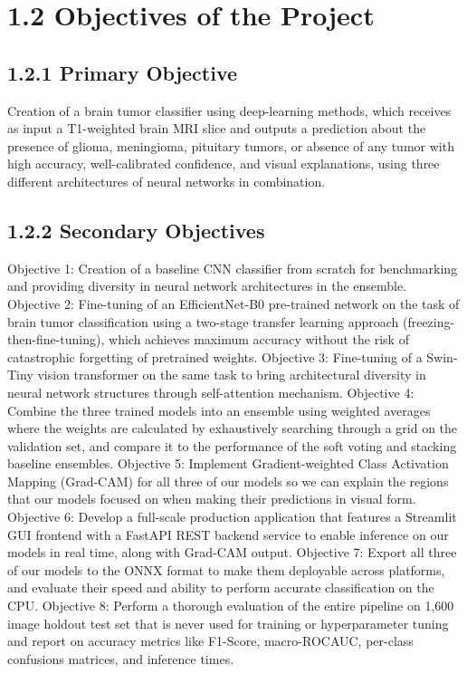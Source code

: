 \documentclass[12pt,a4paper,oneside]{report}
\begin{document}
\section{1.2 Objectives of the Project}
\subsection{1.2.1 Primary Objective}
Creation of a brain tumor classifier using deep-learning methods, which receives as input a T1-weighted brain MRI slice and outputs a prediction about the presence of glioma, meningioma, pituitary tumors, or absence of any tumor with high accuracy, well-calibrated confidence, and visual explanations, using three different architectures of neural networks in combination.
\subsection{1.2.2 Secondary Objectives}
Objective 1: Creation of a baseline CNN classifier from scratch for benchmarking and providing diversity in neural network architectures in the ensemble.
Objective 2: Fine-tuning of an EfficientNet-B0 pre-trained network on the task of brain tumor classification using a two-stage transfer learning approach (freezing-then-fine-tuning), which achieves maximum accuracy without the risk of catastrophic forgetting of pretrained weights.
Objective 3: Fine-tuning of a Swin-Tiny vision transformer on the same task to bring architectural diversity in neural network structures through self-attention mechanism.
Objective 4: Combine the three trained models into an ensemble using weighted averages where the weights are calculated by exhaustively searching through a grid on the validation set, and compare it to the performance of the soft voting and stacking baseline ensembles.
Objective 5: Implement Gradient-weighted Class Activation Mapping (Grad-CAM) for all three of our models so we can explain the regions that our models focused on when making their predictions in visual form.
Objective 6: Develop a full-scale production application that features a Streamlit GUI frontend with a FastAPI REST backend service to enable inference on our models in real time, along with Grad-CAM output.
Objective 7: Export all three of our models to the ONNX format to make them deployable across platforms, and evaluate their speed and ability to perform accurate classification on the CPU.
Objective 8: Perform a thorough evaluation of the entire pipeline on 1,600 image holdout test set that is never used for training or hyperparameter tuning and report on accuracy metrics like F1-Score, macro-ROCAUC, per-class confusions matrices, and inference times.
\end{document}
